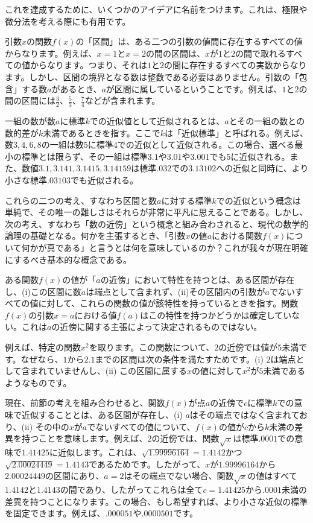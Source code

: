 \documentclass[a4paper,11pt,openany]{ltjsbook}
\begin{document}
これを達成するために、いくつかのアイデアに名前をつけます。これは、極限や微分法を考える際にも有用です。

引数$x$の関数$f(x)$の「区間」は、ある二つの引数の値間に存在するすべての値からなります。例えば、$x=1$と$x=2$の間の区間は、$x$が$1$と$2$の間で取れるすべての値からなります。つまり、それは$1$と$2$の間に存在するすべての実数からなります。しかし、区間の境界となる数は整数である必要はありません。引数の「包含」する数$a$があるとき、$a$が区間に属しているということです。例えば、$1$と$2$の間の区間には$\frac{3}{2}$、$\frac{5}{3}$、$\frac{7}{4}$などが含まれます。

一組の数が数$a$に標準$k$での近似値として近似されるとは、$a$とその一組の数との数的差が$k$未満であるときを指す。ここで$k$は「近似標準」と呼ばれる。例えば、数$3, 4, 6, 8$の一組は数$5$に標準$4$での近似として近似される。この場合、選べる最小の標準とは限らず、その一組は標準$3.1$や$3.01$や$3.001$でも$5$に近似される。また、数値$3.1, 3.141, 3.1415, 3.14159$は標準$.032$での$3.13102$への近似と同時に、より小さな標準$.03103$でも近似される。

これらの二つの考え、すなわち区間と数$a$に対する標準$k$での近似という概念は単純で、その唯一の難しさはそれらが非常に平凡に思えることである。しかし、次の考え、すなわち「数の近傍」という概念と組み合わされると、現代の数学的論理の基礎となる。何かを主張するとき、「引数$x$の値$a$における関数$f(x)$について何かが真である」と言うとは何を意味しているのか？これが我々が現在明確にするべき基本的な概念である。

ある関数$f(x)$の値が「$a$の近傍」において特性を持つとは、ある区間が存在し、(i)この区間に数$a$は端点として含まれず、(ii)その区間内の引数が$a$でないすべての値に対して、これらの関数の値が該特性を持っているときを指す。関数$f(x)$の引数$x=a$における値$f(a)$はこの特性を持つかどうかは確定していない。これは$a$の近傍に関する主張によって決定されるものではない。

例えば、特定の関数$x^{2}$を取ります。この関数について、$2$の近傍では値が$5$未満です。なぜなら、$1$から$2.1$までの区間は次の条件を満たすためです。(i) $2$は端点として含まれていませんし、(ii) この区間に属する$x$の値に対して$x^{2}$が$5$未満であるようなものです。

現在、前節の考えを組み合わせると、関数$f(x)$が点$a$の近傍で$c$に標準$k$での意味で近似することとは、ある区間が存在し、(i) $a$はその端点ではなく含まれており、(ii) その中の$x$が$a$でないすべての値について、$f(x)$の値が$c$から$k$未満の差異を持つことを意味します。例えば、$2$の近傍では、関数$\sqrt{x}$は標準$.0001$での意味で$1.41425$に近似します。これは、$\sqrt{1.99996164}=1.4142$かつ$\sqrt{2.00024449}=1.4143$であるためです。したがって、$x$が$1.99996164$から$2.00024449$の区間にあり、$a=2$はその端点でない場合、関数$\sqrt{x}$の値はすべて$1.4142$と$1.4143$の間であり、したがってこれらは全て$c=1.41425$から$.0001$未満の差異を持つことになります。この場合、もし希望すれば、より小さな近似の標準を固定できます。例えば、$.000051$や$.0000501$です。
\end{document}
